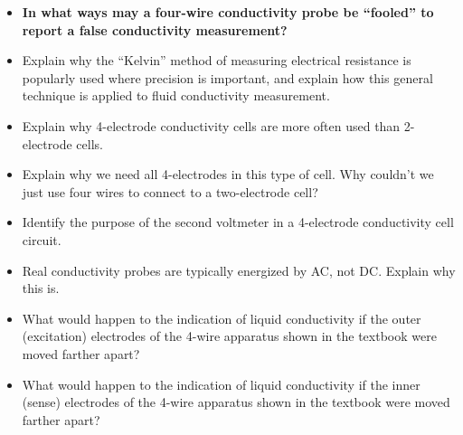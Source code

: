 \begin{itemize}
\item{} {\bf In what ways may a four-wire conductivity probe be ``fooled'' to report a false conductivity measurement?}
\item{} Explain why the ``Kelvin'' method of measuring electrical resistance is popularly used where precision is important, and explain how this general technique is applied to fluid conductivity measurement.
\item{} Explain why 4-electrode conductivity cells are more often used than 2-electrode cells.
\item{} Explain why we need all 4-electrodes in this type of cell.  Why couldn't we just use four wires to connect to a two-electrode cell?
\item{} Identify the purpose of the second voltmeter in a 4-electrode conductivity cell circuit.
\item{} Real conductivity probes are typically energized by AC, not DC.  Explain why this is.
\item{} What would happen to the indication of liquid conductivity if the outer (excitation) electrodes of the 4-wire apparatus shown in the textbook were moved farther apart?
\item{} What would happen to the indication of liquid conductivity if the inner (sense) electrodes of the 4-wire apparatus shown in the textbook were moved farther apart?
\end{itemize}





